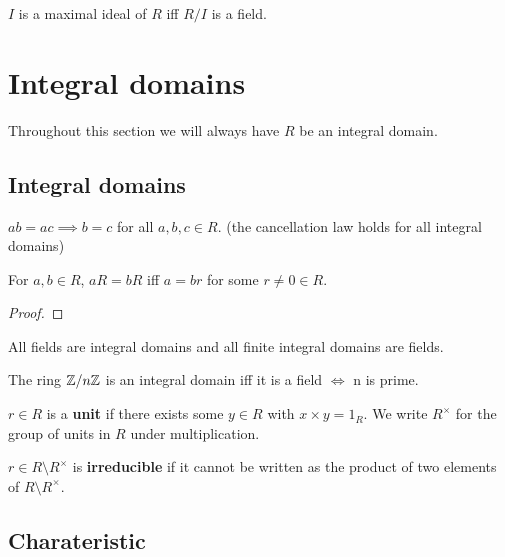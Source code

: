 \documentclass[../Year2.tex]{subfiles}
\begin{document}
\begin{theorem}
    $I$ is a maximal ideal of $R$ iff $R/I$ is a field.
\end{theorem}

\section{Integral domains}
Throughout this section we will always have $R$ be an integral domain.

\subsection{Integral domains}

\begin{theorem}
    $ab=ac\implies b=c$ for all $a,b,c\in R$. (the cancellation law holds for all integral domains)
\end{theorem}

\begin{proposition}
    For $a,b\in R$, $aR=bR$ iff $a=br$ for some $r\neq 0 \in R$.
    \begin{proof}
        
    \end{proof}
\end{proposition}

\begin{theorem}
    All fields are integral domains and all finite integral domains are fields.
\end{theorem}

\begin{remark}
    The ring $\mathbb{Z}/n\mathbb{Z}$ is an integral domain iff it is a field $\iff$ n is prime.
\end{remark}

\begin{definition}[Unit]
    $r\in R$ is a \textbf{unit} if there exists some $y\in R$ with $x\times y=1_R$. We write  $R^\times$ for the group of units in $R$ under multiplication.
\end{definition}

\begin{definition}[Irreducible]
    $r\in R\setminus R^\times$ is \textbf{irreducible} if it cannot be written as the product of two elements of $R\setminus R^\times$.
\end{definition}

\subsection{Charateristic}
\end{document}
